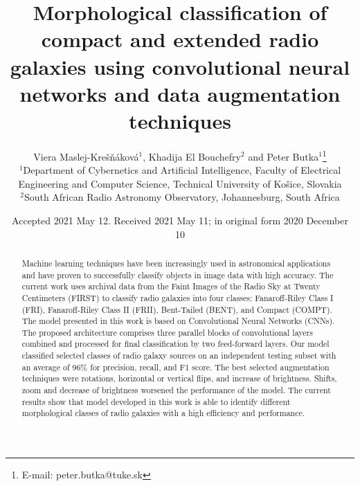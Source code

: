 \documentclass[fleqn,usenatbib]{mnras}
\title[Morphological classification of radio galaxies using convolutional NN and data augmentation]{Morphological classification of compact and extended radio galaxies using convolutional neural networks and data augmentation techniques}
\author[V. Maslej-Kre\v{s}\v{n}\'akov\'a, K. El Bouchefry and P. Butka]{
Viera Maslej-Kre\v{s}\v{n}\'akov\'a$^{1}$, Khadija El Bouchefry$^{2}$ and Peter Butka$^{1}$\thanks{E-mail: peter.butka@tuke.sk}
\\
$^{1}$Department of Cybernetics and Artificial Intelligence, Faculty of Electrical Engineering and Computer Science, Technical University of Košice, Slovakia\\
$^{2}$South African Radio Astronomy Observatory, Johannesburg, South Africa \\
}
\date{Accepted 2021 May 12. Received 2021 May 11; in original form 2020 December 10}
\begin{document}
\label{firstpage}
\pagerange{\pageref{firstpage}--\pageref{lastpage}}
\maketitle

\begin{abstract}
 
 Machine learning techniques have been increasingly used in astronomical applications and have proven to  successfully  classify objects in image data with high accuracy. The current work uses archival data from the Faint Images of the Radio Sky at Twenty Centimeters (FIRST) to classify radio galaxies into four classes: Fanaroff-Riley Class I (FRI), Fanaroff-Riley Class II (FRII), Bent-Tailed (BENT), and Compact (COMPT). The  model presented in this work is based on Convolutional Neural Networks (CNNs). The proposed architecture comprises three parallel blocks of convolutional layers combined and processed for final classification by two feed-forward layers. Our model classified selected classes of radio galaxy sources on an independent testing subset with an average of 96\% for precision, recall, and F1 score. The best selected augmentation techniques were rotations, horizontal or vertical flips, and increase of brightness. Shifts, zoom and decrease of brightness worsened the performance of the model. The current results show that model developed in this work is able to identify different morphological classes of radio galaxies with a high efficiency and performance.

\end{abstract}
\end{document}
